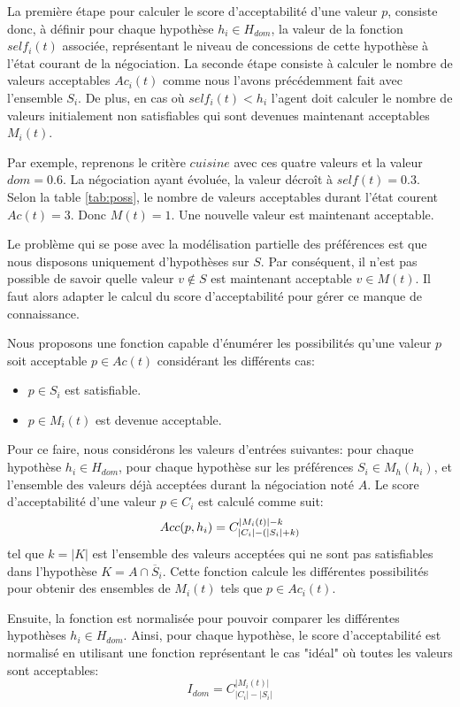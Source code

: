La première étape pour calculer le score d'acceptabilité d'une valeur $p$, consiste donc, à définir pour chaque hypothèse $h_i \in H_{dom}$, la valeur de la fonction $self_i(t)$ associée, représentant le niveau de concessions de cette hypothèse à l'état courant de la négociation. 
La seconde étape consiste à calculer le nombre de valeurs acceptables $Ac_i(t)$ comme nous l'avons précédemment fait avec l'ensemble $S_i$. De plus, en cas  où $self_i(t) < h_i$ l'agent doit calculer le nombre de valeurs initialement non satisfiables qui sont devenues maintenant acceptables $M_i(t)$.

Par exemple, reprenons le critère $cuisine$ avec ces quatre valeurs et la valeur $dom=0.6$. La négociation ayant évoluée, la valeur décroît à $self(t) = 0.3$. 
Selon la table \ref{tab:poss}, le nombre de valeurs acceptables durant l'état courent $Ac(t) = 3$. Donc $M(t) =1$. Une nouvelle valeur est maintenant acceptable. 

Le problème qui se pose avec la modélisation partielle des préférences est que nous disposons uniquement d'hypothèses sur $S$. Par conséquent, il n'est pas possible de savoir quelle valeur $v \not \in S$ est maintenant acceptable $v \in M(t)$. Il faut alors adapter le calcul du score d'acceptabilité pour gérer ce manque de connaissance.

Nous proposons une fonction capable d'énumérer les possibilités qu'une valeur $p$ soit acceptable $p \in Ac(t)$ considérant les différents cas: 
\begin{itemize}
	\item $p \in S_i$ est satisfiable.
	\item $p \in M_i(t)$ est devenue acceptable. 
\end{itemize} 
Pour ce faire, nous considérons les valeurs d'entrées suivantes:
pour chaque hypothèse $h_i \in H_{dom}$, pour chaque hypothèse sur les préférences $S_i \in M_h(h_i)$, et l'ensemble des valeurs déjà acceptées durant la négociation noté $A$.
Le score d'acceptabilité d'une valeur $p \in C_i$ est calculé comme suit:
\begin{equation}
\centering
Acc(p, h_i) = C_{|C_i|-(|S_i| + k)}^{|M_i(t)| - k}
\end{equation}
tel que $k = |K| $ est l'ensemble des valeurs acceptées qui ne sont pas satisfiables dans l'hypothèse $K=A \cap \overline S_i$. Cette fonction calcule les différentes possibilités pour obtenir des ensembles de $M_i(t)$ tels que $p \in Ac_i(t)$. 

Ensuite, la fonction est normalisée pour pouvoir comparer les différentes hypothèses $h_i \in H_{dom}$. Ainsi, pour chaque hypothèse, le score d'acceptabilité est normalisé en utilisant une fonction représentant le cas "idéal" où toutes les valeurs sont acceptables: 
$$I_{dom} = C_{|C_i|-|S_i|}^{|M_i(t)|}$$

